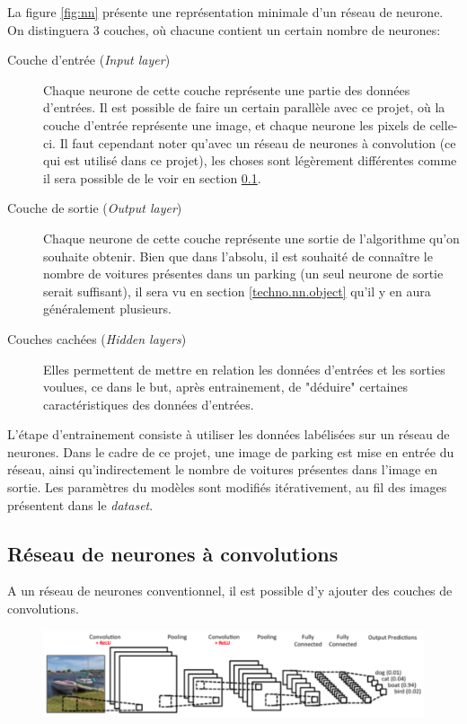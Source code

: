 La figure \ref{fig:nn} présente une représentation minimale d'un réseau de neurone. On distinguera 3 couches, où chacune contient un certain nombre de neurones:
\begin{description}
    \item[Couche d'entrée (\textit{Input layer})] Chaque neurone de cette couche représente une partie des données d'entrées. Il est possible de faire un certain parallèle avec ce projet, où la couche d'entrée représente une image, et chaque neurone les pixels de celle-ci. Il faut cependant noter qu'avec un réseau de neurones à convolution (ce qui est utilisé dans ce projet), les choses sont légèrement différentes comme il sera possible de le voir en section \ref{techno.nn.convolution}.
    \item[Couche de sortie (\textit{Output layer})] Chaque neurone de cette couche représente une sortie de l'algorithme qu'on souhaite obtenir. Bien que dans l'absolu, il est souhaité de connaître le nombre de voitures présentes dans un parking (un seul neurone de sortie serait suffisant), il sera vu en section \ref{techno.nn.object} qu'il y en aura généralement plusieurs.
    \item[Couches cachées (\textit{Hidden layers})] Elles permettent de mettre en relation les données d'entrées et les sorties voulues, ce dans le but, après entrainement, de "déduire" certaines caractéristiques des données d'entrées.
\end{description}

L'étape d'entrainement consiste à utiliser les données labélisées sur un réseau de neurones. Dans le cadre de ce projet, une image de parking est mise en entrée du réseau, ainsi qu'indirectement le nombre de voitures présentes dans l'image en sortie. Les paramètres du modèles sont modifiés itérativement, au fil des images présentent dans le \textit{dataset}.

\subsection{Réseau de neurones à convolutions}\label{techno.nn.convolution}
A un réseau de neurones conventionnel, il est possible d'y ajouter des couches de convolutions. 

\begin{figure}[ht]
    \includegraphics[width=120mm]{img/bases_technologiques/cnn.png}
    \centering
    \label{fig:cnn}
\end{figure}

